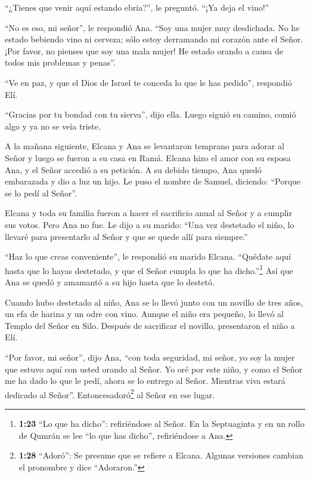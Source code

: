  ``¿Tienes que venir aquí estando ebria?'', le preguntó.
``¡Ya deja el vino!''

 ``No es eso, mi señor'', le respondió Ana. ``Soy una mujer
muy desdichada. No he estado bebiendo vino ni cerveza; sólo estoy
derramando mi corazón ante el Señor.  ¡Por favor, no
pienses que soy una mala mujer! He estado orando a causa de todos mis
problemas y penas''.

 ``Ve en paz, y que el Dios de Israel te conceda lo que le
has pedido'', respondió Elí.

 ``Gracias por tu bondad con tu sierva'', dijo ella. Luego
siguió su camino, comió algo y ya no se veía triste.

 A la mañana siguiente, Elcana y Ana se levantaron temprano
para adorar al Señor y luego se fueron a su casa en Ramá. Elcana hizo el
amor con su esposa Ana, y el Señor accedió a su petición. 
A su debido tiempo, Ana quedó embarazada y dio a luz un hijo. Le puso el
nombre de Samuel, diciendo: ``Porque se lo pedí al Señor''.

 Elcana y toda su familia fueron a hacer el sacrificio
anual al Señor y a cumplir sus votos.  Pero Ana no fue. Le
dijo a su marido: ``Una vez destetado el niño, lo llevaré para
presentarlo al Señor y que se quede allí para siempre.''

 ``Haz lo que creas conveniente'', le respondió su marido
Elcana. ``Quédate aquí hasta que lo hayas destetado, y que el Señor
cumpla lo que ha dicho.''\footnote{\textbf{1:23} ``Lo que ha dicho'':
  refiriéndose al Señor. En la Septuaginta y en un rollo de Qumrán se
  lee ``lo que has dicho'', refiriéndose a Ana.} Así que Ana se quedó y
amamantó a su hijo hasta que lo destetó.

 Cuando hubo destetado al niño, Ana se lo llevó junto con
un novillo de tres años, un efa de harina y un odre con vino. Aunque el
niño era pequeño, lo llevó al Templo del Señor en Silo. 
Después de sacrificar el novillo, presentaron el niño a Elí.

 ``Por favor, mi señor'', dijo Ana, ``con toda seguridad,
mi señor, yo soy la mujer que estuvo aquí con usted orando al Señor.
 Yo oré por este niño, y como el Señor me ha dado lo que le
pedí,  ahora se lo entrego al Señor. Mientras viva estará
dedicado al Señor''. Entoncesadoró\footnote{\textbf{1:28} ``Adoró'': Se
  presume que se refiere a Elcana. Algunas versiones cambian el
  pronombre y dice ``Adoraron.''} al Señor en ese lugar.

